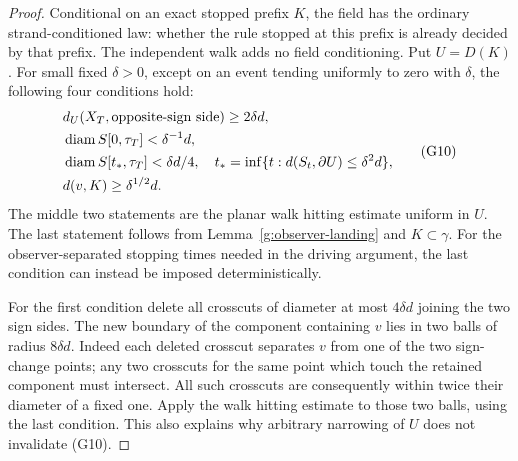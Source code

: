 \begin{proof}
Conditional on an exact stopped prefix \(K\), the field has the
ordinary strand-conditioned law: whether the rule stopped at this
prefix is already decided by that prefix. The independent walk
adds no field conditioning. Put \(U=D(K)\).
For small fixed \(\delta>0\), except on an event tending uniformly
to zero with \(\delta\), the following four conditions hold:
\[
\begin{split}
 &d_U(X_T,\hbox{opposite-sign side})\geq2\delta d,\\
 &\operatorname{diam} S[0,\tau_T]<\delta^{-1}d,\\
 &\operatorname{diam} S[t_*,\tau_T]<\delta d/4,
 \quad t_*=\inf\{t:d(S_t,\partial U)\leq\delta^2d\},\\
 &d(v,K)\geq\delta^{1/2}d.
\end{split}                                                   \tag{G10}
\]
The middle two statements are the planar walk hitting estimate
uniform in \(U\). The last statement follows from
Lemma~\ref{g:observer-landing} and \(K\subset\gamma\).
For the observer-separated stopping times needed in the driving
argument, the last condition can instead be imposed deterministically.

For the first condition delete all crosscuts of diameter at most
\(4\delta d\) joining the two sign sides. The new boundary of the
component containing \(v\) lies in two balls of radius \(8\delta d\).
Indeed each deleted crosscut separates \(v\) from one of the two
sign-change points; any two crosscuts for the same point which
touch the retained component must intersect. All such crosscuts
are consequently within twice their diameter of a fixed one.
Apply the walk hitting estimate to those two balls, using the last
condition. This also explains why arbitrary narrowing of \(U\)
does not invalidate (G10).


\end{proof}
